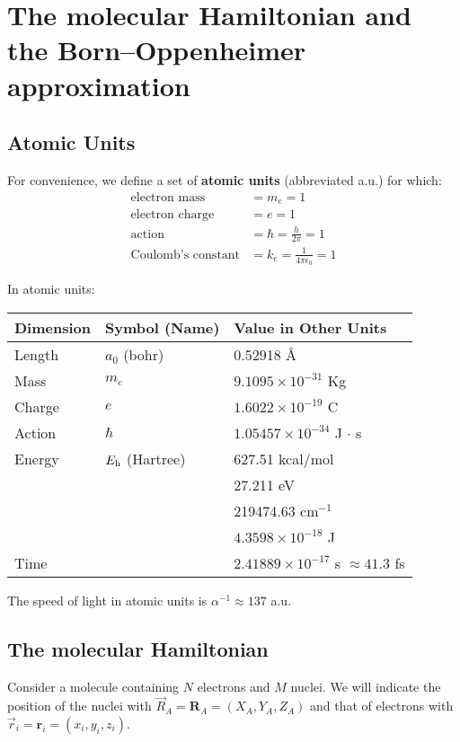\documentclass[../Main/chem532-notes.tex]{subfiles}
\begin{document}
\chapter[The molecular Hamiltonian]{The molecular Hamiltonian and the Born--Oppenheimer approximation}

\section{Atomic Units} 
For convenience, we define a set of \textbf{atomic units} (abbreviated a.u.) for which:
\begin{align}
\text{electron mass} & = m_e = 1\\
\text{electron charge} & = e = 1\\
\text{action} & = \hbar = \frac{h}{2\pi} = 1\\
\text{Coulomb's constant} & = k_e = \frac{1}{4\pi \epsilon_0} = 1
\end{align}

In atomic units:
\begin{table}[htbp]
\centering
\begin{tabular}{lll}
\toprule
Dimension & Symbol (Name) & Value in Other Units\\
\midrule
Length & $a_0$ (bohr) & 0.52918 \AA{} \\ 
Mass & $m_e$ & $9.1095 \times 10^{-31}$ Kg \\
Charge & $e$ & $1.6022 \times 10^{-19}$ C \\
Action & $\hbar$ & $1.05457 \times 10^{-34}$ J $\cdot$ s \\
Energy & $E_{\rm h}$ (Hartree) & 627.51 kcal/mol \\
& & 27.211 eV \\
& & 219474.63 cm$^{-1}$ \\
& & $4.3598 \times 10^{-18}$ J\\
Time & & $2.41889 \times 10^{-17}$ s $\approx 41.3$ fs\\
\bottomrule
\end{tabular}
\label{tab:atomicunits}
\end{table}

The speed of light in atomic units is $\alpha^{-1}\approx 137$ a.u.

\section{The molecular Hamiltonian}
Consider a molecule containing $N$ electrons and $M$ nuclei.
We will indicate the position of the nuclei with $\vec{R}_A = \mathbf{R}_A = (X_A,Y_A,Z_A)$ and that of electrons with $\vec{r}_i = \mathbf{r}_i = (x_i,y_i,z_i)$.
\end{document}
